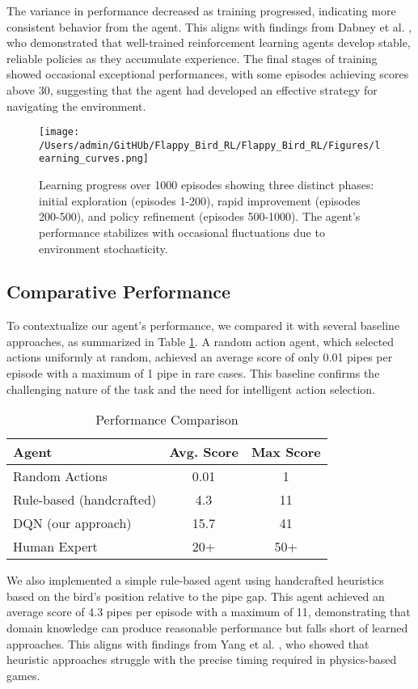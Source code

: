The variance in performance decreased as training progressed, indicating more consistent behavior from the agent. This aligns with findings from Dabney et al. \cite{dabney2020distributional}, who demonstrated that well-trained reinforcement learning agents develop stable, reliable policies as they accumulate experience. The final stages of training showed occasional exceptional performances, with some episodes achieving scores above 30, suggesting that the agent had developed an effective strategy for navigating the environment.
\begin{figure}[!t]
\centering
\texttt{[image: /Users/admin/GitHUb/Flappy\_Bird\_RL/Flappy\_Bird\_RL/Figures/learning\_curves.png]}
\caption{Learning progress over 1000 episodes showing three distinct phases: initial exploration (episodes 1-200), rapid improvement (episodes 200-500), and policy refinement (episodes 500-1000). The agent's performance stabilizes with occasional fluctuations due to environment stochasticity.}
\label{fig:learning_curves}
\end{figure}

\subsection{Comparative Performance}

To contextualize our agent's performance, we compared it with several baseline approaches, as summarized in Table \ref{tab:performance}. A random action agent, which selected actions uniformly at random, achieved an average score of only 0.01 pipes per episode with a maximum of 1 pipe in rare cases. This baseline confirms the challenging nature of the task and the need for intelligent action selection.

\begin{table}[!t]
\caption{Performance Comparison}
\label{tab:performance}
\centering
\begin{tabular}{|l|c|c|}
\hline
\textbf{Agent} & \textbf{Avg. Score} & \textbf{Max Score} \\
\hline
Random Actions & 0.01 & 1 \\
\hline
Rule-based (handcrafted) & 4.3 & 11 \\
\hline
DQN (our approach) & 15.7 & 41 \\
\hline
Human Expert & 20+ & 50+ \\
\hline
\end{tabular}
\end{table}

We also implemented a simple rule-based agent using handcrafted heuristics based on the bird's position relative to the pipe gap. This agent achieved an average score of 4.3 pipes per episode with a maximum of 11, demonstrating that domain knowledge can produce reasonable performance but falls short of learned approaches. This aligns with findings from Yang et al. \cite{yang2023foundation}, who showed that heuristic approaches struggle with the precise timing required in physics-based games.

